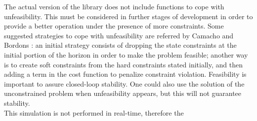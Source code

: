The actual version of the library does not include functions to cope with unfeasibility. This must be considered in further stages of development in order to provide a better operation under the presence of more constraints. Some suggested strategies to cope with unfeasibility are referred by Camacho and Bordons \cite{ref:CamachoBordons}: an initial strategy consists of dropping the state constraints at the initial portion of the horizon in order to make the problem feasible; another way is to create soft constraints from the hard constraints stated initially, and then adding a term in the cost function to penalize constraint violation. Feasibility is important to assure closed-loop stability. One could also use the solution of the unconstrained problem  when unfeasibility appears, but this will not guarantee stability.\\

This simulation is not performed in real-time, therefore the 




